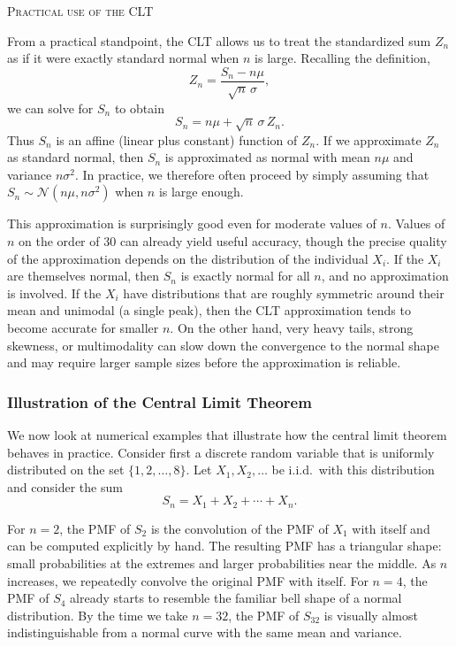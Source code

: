 \bigskip
\textsc{Practical use of the CLT}

From a practical standpoint, the CLT allows us to treat the standardized sum \(Z_n\) as if it were exactly standard normal when \(n\) is large.  
Recalling the definition,
\[
Z_n
=
\frac{S_n - n\mu}{\sqrt{n}\,\sigma},
\]
we can solve for \(S_n\) to obtain
\[
S_n
=
n\mu + \sqrt{n}\,\sigma\,Z_n.
\]
Thus \(S_n\) is an affine (linear plus constant) function of \(Z_n\).  
If we approximate \(Z_n\) as standard normal, then \(S_n\) is approximated as normal with mean \(n\mu\) and variance \(n\sigma^2\).  
In practice, we therefore often proceed by simply assuming that \(S_n \sim \mathcal{N}(n\mu, n\sigma^2)\) when \(n\) is large enough.

This approximation is surprisingly good even for moderate values of \(n\).  
Values of \(n\) on the order of \(30\) can already yield useful accuracy, though the precise quality of the approximation depends on the distribution of the individual \(X_i\).  
If the \(X_i\) are themselves normal, then \(S_n\) is exactly normal for all \(n\), and no approximation is involved.  
If the \(X_i\) have distributions that are roughly symmetric around their mean and unimodal (a single peak), then the CLT approximation tends to become accurate for smaller \(n\).  
On the other hand, very heavy tails, strong skewness, or multimodality can slow down the convergence to the normal shape and may require larger sample sizes before the approximation is reliable.

\subsubsection{Illustration of the Central Limit Theorem}

We now look at numerical examples that illustrate how the central limit theorem behaves in practice.  
Consider first a discrete random variable that is uniformly distributed on the set \(\{1,2,\ldots,8\}\).  
Let \(X_1, X_2, \ldots\) be i.i.d.\ with this distribution and consider the sum
\[
S_n = X_1 + X_2 + \cdots + X_n.
\]

For \(n = 2\), the PMF of \(S_2\) is the convolution of the PMF of \(X_1\) with itself and can be computed explicitly by hand.  
The resulting PMF has a triangular shape: small probabilities at the extremes and larger probabilities near the middle.  
As \(n\) increases, we repeatedly convolve the original PMF with itself.  
For \(n = 4\), the PMF of \(S_4\) already starts to resemble the familiar bell shape of a normal distribution.  
By the time we take \(n = 32\), the PMF of \(S_{32}\) is visually almost indistinguishable from a normal curve with the same mean and variance.

